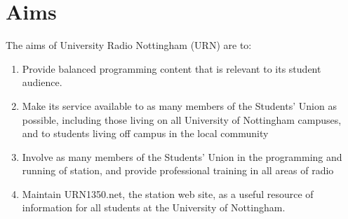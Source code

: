 \section{Aims}

The aims of University Radio Nottingham (URN) are to:

\begin{enumerate}[label*=\thesection.\arabic*.]
    \item Provide balanced programming content that is relevant to its student audience.
    \item Make its service available to as many members of the Students' Union as possible, including those living on all University of Nottingham campuses, and to students living off campus in the local community
    \item Involve as many members of the Students’ Union in the programming and running of station, and provide professional training in all areas of radio
    \item Maintain URN1350.net, the station web site, as a useful resource of information for all students at the University of Nottingham.
\end{enumerate}
